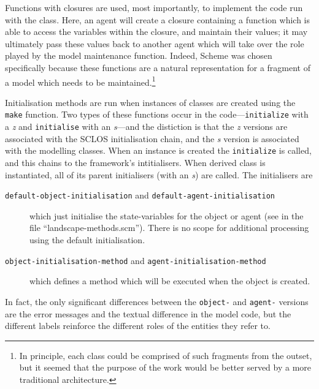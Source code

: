 Functions with closures are used, most importantly, to implement the
code run with the  class. Here, an agent will
create a closure containing a function which is able to access the
variables within the closure, and maintain their values; it may
ultimately pass these values back to another agent which will take
over the role played by the model maintenance function.  Indeed,
\textsf{Scheme} was chosen specifically because these functions are a natural
representation for a fragment of a model which needs to be
maintained.\footnote{In principle, each class could be comprised of such
fragments from the outset, but it seemed that the purpose of the
work would be better served by a more traditional architecture.}

Initialisation methods are run when instances of classes are created
using the \texttt{make} function.  Two types of these functions occur
in the code---\texttt{initialize} with a \emph{z} and
\texttt{initialise} with an \emph{s}---and the distiction is that
the \emph{z} versions are associated with the \textsf{SCLOS} initialisation
chain, and the \emph{s} version is associated with the modelling
classes. When an instance is created the 
\texttt{initialize} is called, and this chains to the framework's
intitialisers.  When  derived class is instantiated, all of
its parent initialisers (with an \emph{s}) are called.  The
initialisers are
\begin{description}
  \item[\texttt{default-object-initialisation} and
    \texttt{default-agent-initialisation}] which just initialise the
    state-variables for the object or agent (see  in the
    file ``landscape-methods.scm''). There is no scope for additional
    processing using the default initialisation.
  \item[\texttt{object-initialisation-method} and
    \texttt{agent-initialisation-method}] which defines a method which
    will be executed when the object is created.
\end{description}
In fact, the only significant differences between the \texttt{object-}
and \texttt{agent-} versions are the error messages and the textual
difference in the model code, but the different labels reinforce the
different roles of the entities they refer to.
    
